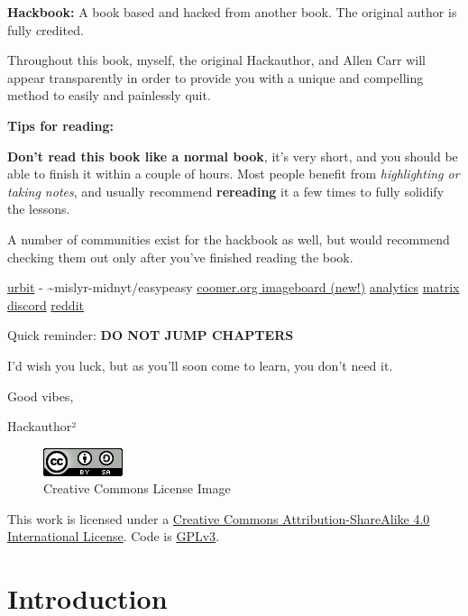 \documentclass[
]{book}
\begin{document}
{\textbf{Hackbook:} A book based and hacked from another book. The original author is fully credited. }

Throughout this book, myself, the original Hackauthor, and Allen Carr will appear transparently in order to provide you with a unique and compelling method to easily and painlessly quit.

{\textbf{Tips for reading:}}

\textbf{Don't read this book like a normal book}, it's very short, and you should be able to finish it within a couple of hours. Most people benefit from \emph{highlighting or taking notes}, and usually recommend \textbf{rereading} it a few times to fully solidify the lessons.

A number of communities exist for the hackbook as well, but would recommend checking them out only after you've finished reading the book.

\href{https://urbit.org}{urbit} - \textasciitilde mislyr-midnyt/easypeasy \textbar{} \href{https://coomer.org}{coomer.org imageboard (new!)} \textbar{} \href{https://plausible.io/easypeasymethod.org}{analytics} \textbar{} \href{https://matrix.to/\#/!xmJZznbJXuwzEGSEti:matrix.org?via=matrix.org}{matrix} \textbar{} \href{https://discord.com/invite/bCXEnf9}{discord} \textbar{} \href{https://reddit.com/r/pmohackbook}{reddit}

Quick reminder: {\textbf{DO NOT JUMP CHAPTERS}}

I'd wish you luck, but as you'll soon come to learn, you don't need it.

Good vibes,

Hackauthor²

\begin{figure}
\centering
\includegraphics[width=0.91667in,height=0.32292in]{images/cc.png}
\caption{Creative Commons License Image}
\end{figure}

This work is licensed under a \href{https://creativecommons.org/licenses/by-sa/4.0/}{Creative Commons Attribution-ShareAlike 4.0 International License}. Code is \href{https://gitlab.com/snuggy/easypeasy/-/blob/master/LICENSE}{GPLv3}.

\hypertarget{introduction}{%
\chapter{Introduction}\label{introduction}}
\end{document}
